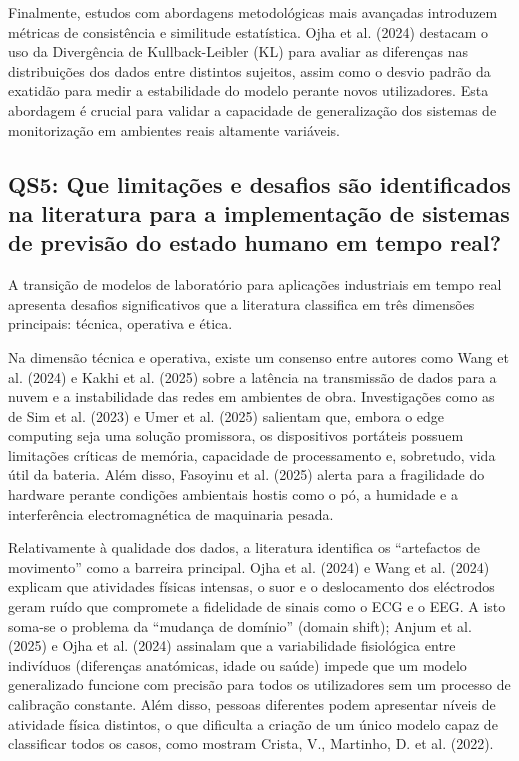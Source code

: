 Finalmente, estudos com abordagens metodológicas mais avançadas introduzem métricas de consistência e similitude estatística. Ojha et al. (2024)\cite{ojha2024} destacam o uso da Divergência de Kullback-Leibler (KL) para avaliar as diferenças nas distribuições dos dados entre distintos sujeitos, assim como o desvio padrão da exatidão para medir a estabilidade do modelo perante novos utilizadores. Esta abordagem é crucial para validar a capacidade de generalização dos sistemas de monitorização em ambientes reais altamente variáveis.

\subsection*{QS5: Que limitações e desafios são identificados na literatura para a implementação de sistemas de previsão do estado humano em tempo real?}
\label{subsec:qs5}

A transição de modelos de laboratório para aplicações industriais em tempo real apresenta desafios significativos que a literatura classifica em três dimensões principais: técnica, operativa e ética.

Na dimensão técnica e operativa, existe um consenso entre autores como Wang et al. (2024) e Kakhi et al. (2025)\cite{wang2024,kakhi2025} sobre a latência na transmissão de dados para a nuvem e a instabilidade das redes em ambientes de obra. Investigações como as de Sim et al. (2023) e Umer et al. (2025)\cite{sim2023,umer2025} salientam que, embora o edge computing seja uma solução promissora, os dispositivos portáteis possuem limitações críticas de memória, capacidade de processamento e, sobretudo, vida útil da bateria. Além disso, Fasoyinu et al. (2025)\cite{fasoyinu2025} alerta para a fragilidade do hardware perante condições ambientais hostis como o pó, a humidade e a interferência electromagnética de maquinaria pesada.

Relativamente à qualidade dos dados, a literatura identifica os ``artefactos de movimento'' como a barreira principal. Ojha et al. (2024) e Wang et al. (2024)\cite{ojha2024,wang2024} explicam que atividades físicas intensas, o suor e o deslocamento dos eléctrodos geram ruído que compromete a fidelidade de sinais como o ECG e o EEG. A isto soma-se o problema da ``mudança de domínio'' (domain shift); Anjum et al. (2025) e Ojha et al. (2024)\cite{anjum2025,ojha2024} assinalam que a variabilidade fisiológica entre indivíduos (diferenças anatómicas, idade ou saúde) impede que um modelo generalizado funcione com precisão para todos os utilizadores sem um processo de calibração constante. Além disso, pessoas diferentes podem apresentar níveis de atividade física distintos, o que dificulta a criação de um único modelo capaz de classificar todos os casos, como mostram Crista, V., Martinho, D. et al. (2022)\cite{crista2022physicalactivity}.

